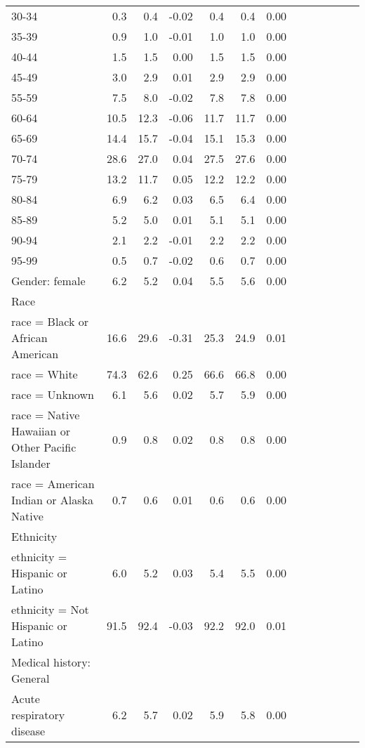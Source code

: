 \documentclass[11pt,]{article}
\begin{document}
\begin{longtable}{lrrrrrrrrrrrr}
      30-34 &  0.3 &  0.4 & -0.02 &  0.4 &  0.4 &  0.00 \\ 
      35-39 &  0.9 &  1.0 & -0.01 &  1.0 &  1.0 &  0.00 \\ 
      40-44 &  1.5 &  1.5 &  0.00 &  1.5 &  1.5 &  0.00 \\ 
      45-49 &  3.0 &  2.9 &  0.01 &  2.9 &  2.9 &  0.00 \\ 
      55-59 &  7.5 &  8.0 & -0.02 &  7.8 &  7.8 &  0.00 \\ 
      60-64 & 10.5 & 12.3 & -0.06 & 11.7 & 11.7 &  0.00 \\ 
      65-69 & 14.4 & 15.7 & -0.04 & 15.1 & 15.3 &  0.00 \\ 
      70-74 & 28.6 & 27.0 &  0.04 & 27.5 & 27.6 &  0.00 \\ 
      75-79 & 13.2 & 11.7 &  0.05 & 12.2 & 12.2 &  0.00 \\ 
      80-84 &  6.9 &  6.2 &  0.03 &  6.5 &  6.4 &  0.00 \\ 
      85-89 &  5.2 &  5.0 &  0.01 &  5.1 &  5.1 &  0.00 \\ 
      90-94 &  2.1 &  2.2 & -0.01 &  2.2 &  2.2 &  0.00 \\ 
      95-99 &  0.5 &  0.7 & -0.02 &  0.6 &  0.7 &  0.00 \\ 
  Gender: female &  6.2 &  5.2 &  0.04 &  5.5 &  5.6 &  0.00 \\ 
  Race &    &    &     &    &    &     \\ 
      race = Black or African American & 16.6 & 29.6 & -0.31 & 25.3 & 24.9 &  0.01 \\ 
      race = White & 74.3 & 62.6 &  0.25 & 66.6 & 66.8 &  0.00 \\ 
      race = Unknown &  6.1 &  5.6 &  0.02 &  5.7 &  5.9 &  0.00 \\ 
      race = Native Hawaiian or Other Pacific Islander &  0.9 &  0.8 &  0.02 &  0.8 &  0.8 &  0.00 \\ 
      race = American Indian or Alaska Native &  0.7 &  0.6 &  0.01 &  0.6 &  0.6 &  0.00 \\ 
  Ethnicity &    &    &     &    &    &     \\ 
      ethnicity = Hispanic or Latino &  6.0 &  5.2 &  0.03 &  5.4 &  5.5 &  0.00 \\ 
      ethnicity = Not Hispanic or Latino & 91.5 & 92.4 & -0.03 & 92.2 & 92.0 &  0.01 \\ 
  Medical history: General &    &    &     &    &    &     \\ 
      Acute respiratory disease &  6.2 &  5.7 &  0.02 &  5.9 &  5.8 &  0.00 \\ 

\end{longtable}
\end{document}
